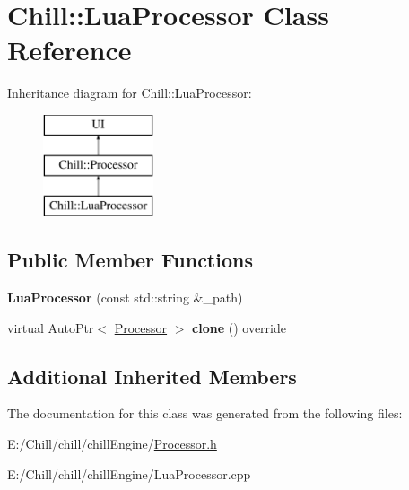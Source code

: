 \hypertarget{class_chill_1_1_lua_processor}{}\section{Chill\+:\+:Lua\+Processor Class Reference}
\label{class_chill_1_1_lua_processor}
Inheritance diagram for Chill\+:\+:Lua\+Processor\+:\begin{figure}[H]
\begin{center}
\leavevmode
\includegraphics[height=3.000000cm]{class_chill_1_1_lua_processor}
\end{center}
\end{figure}
\subsection*{Public Member Functions}
\begin{DoxyCompactItemize}
\item 
\mbox{\label{class_chill_1_1_lua_processor_a4f669bc7bb348a847b07bdcfb913a878}} 
{\bfseries Lua\+Processor} (const std\+::string \&\+\_\+path)
\item 
\mbox{\label{class_chill_1_1_lua_processor_a48195953233edfe7e77d2791789b8b4a}} 
virtual Auto\+Ptr$<$ \mbox{\hyperlink{class_chill_1_1_processor}{Processor}} $>$ {\bfseries clone} () override
\end{DoxyCompactItemize}
\subsection*{Additional Inherited Members}


The documentation for this class was generated from the following files\+:\begin{DoxyCompactItemize}
\item 
E\+:/\+Chill/chill/chill\+Engine/\mbox{\hyperlink{_processor_8h}{Processor.\+h}}\item 
E\+:/\+Chill/chill/chill\+Engine/Lua\+Processor.\+cpp\end{DoxyCompactItemize}
